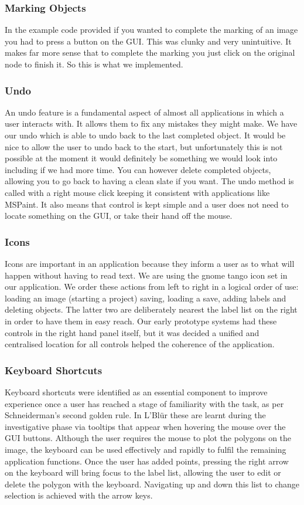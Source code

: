 \documentclass[a4paper,11pt,oneside]{article}
\begin{document}
\subsubsection{Marking Objects}
In the example code provided if you wanted to complete the marking of an image
you had to press a button on the GUI.  This was clunky and very unintuitive.  It
makes far more sense that to complete the marking you just click on the original
node to finish it.  So this is what we implemented.

\subsubsection{Undo}
An undo feature is a fundamental aspect of almost all applications in which
a user interacts with.  It allows them to fix any mistakes they might make.  We
have our undo which is able to undo back to the last completed object.  It would
be nice to allow the user to undo back to the start, but unfortunately this is
not possible at the moment it would definitely be something we would look into 
including if we had more time.  You can however delete completed objects, 
allowing you to go back to having a clean slate if you want.  The undo method
is called with a right mouse click keeping it consistent with applications like
MSPaint.  It also means that control is kept simple and a user does not need
to locate something on the GUI, or take their hand off the mouse.

\subsubsection{Icons}
Icons are important in an application because they inform a user as to what will
happen without having to read text.  We are using the gnome tango icon set in
our application.  We order these actions from left to right in a logical order
of use: loading an image (starting a project) saving, loading a save, adding
labels and deleting objects. The latter two are deliberately nearest the label
list on the right in order to have them in easy reach. Our early prototype
systems had these controls in the right hand panel itself, but it was decided a
unified and centralised location for all controls helped the coherence of the
application.

\subsubsection{Keyboard Shortcuts}
Keyboard shortcuts were identified as an essential component to improve
experience once a user has reached a stage of familiarity with the task, as per
Schneiderman's second golden rule.  In L'Bl\"{u}r these are learnt during the
investigative phase via tooltips that appear when hovering the mouse over the
GUI buttons. Although the user requires the mouse to plot the polygons on the
image, the keyboard can be used effectively and rapidly to fulfil the remaining
application functions. Once the user has added points, pressing the right arrow
on the keyboard will bring focus to the label list, allowing the user to edit or
delete the polygon with the keyboard. Navigating up and down this list to change
selection is achieved with the arrow keys.
\end{document}
